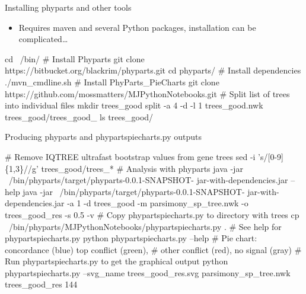 \documentclass[compress, ucs, xelatex, 11pt, xcolor=x11names, aspectratio=169,
	hyperref={
		bookmarks=true,
		unicode=true,
		colorlinks=true,
		pdftitle={HybSeq course},
		plainpages=false,
		pdfauthor={Vojtech Zeisek},
		pdfsubject={Practical processing of HybSeq target enrichment sequencing data on computing grids like MetaCentrum},
		pdfcreator={XeLaTeX},
		pdfkeywords={BASH, command line, GNU, HybSeq, Linux, MetaCentrum, sequencing shell, target enrichment},
		linkcolor=Turquoise4, %
		anchorcolor=DodgerBlue4, %
		citecolor=DodgerBlue4, %
		filecolor=DodgerBlue4, %
		menucolor=Tan4, %
		urlcolor=DarkOliveGreen4, %
		pdftex},
	url={hyphens, lowtilde} %
	]{beamer}
\renewcommand{\texttt}[1]{\colorbox{Cornsilk2}{{\ttfamily #1}}}
\begin{document}
\begin{frame}[fragile]{Installing phyparts and other tools}
	\begin{itemize}
		\item Requires \texttt{maven} and several Python packages, installation can be complicated\ldots
	\end{itemize}
	\begin{bashcode}
    cd ~/bin/
    # Install Phyparts
    git clone https://bitbucket.org/blackrim/phyparts.git
    cd phyparts/
    # Install dependencies
    ./mvn_cmdline.sh
    # Install PhyParts_PieCharts
    git clone https://github.com/mossmatters/MJPythonNotebooks.git
    # Split list of trees into individual files
    mkdir trees_good
    split -a 4 -d -l 1 trees_good.nwk trees_good/trees_good_
    ls trees_good/
	\end{bashcode}
\end{frame}

\begin{frame}[fragile]{Producing phyparts and phypartspiecharts.py outputs}
	\begin{bashcode}
    # Remove IQTREE ultrafast bootstrap values from gene trees
    sed -i 's/\/[0-9]\{1,3\}//g' trees_good/trees_*
    # Analysis with phyparts
    java -jar ~/bin/phyparts/target/phyparts-0.0.1-SNAPSHOT-
      jar-with-dependencies.jar --help
    java -jar ~/bin/phyparts/target/phyparts-0.0.1-SNAPSHOT-
      jar-with-dependencies.jar -a 1 -d trees_good -m
      parsimony_sp_tree.nwk -o trees_good_res -s 0.5 -v
    # Copy phypartspiecharts.py to directory with trees
    cp ~/bin/phyparts/MJPythonNotebooks/phypartspiecharts.py .
    # See help for phypartspiecharts.py
    python phypartspiecharts.py --help
    # Pie chart: concordance (blue) top conflict (green),
    # other conflict (red), no signal (gray)
    # Run phypartspiecharts.py to get the graphical output
    python phypartspiecharts.py --svg_name trees_good_res.svg
      parsimony_sp_tree.nwk trees_good_res 144
	\end{bashcode}
\end{frame}
\end{document}
